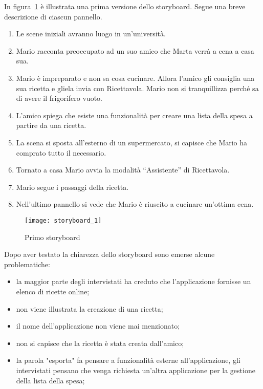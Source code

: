 In figura~\ref{fig:storyboard_1} è illustrata una prima versione dello storyboard.
Segue una breve descrizione di ciascun pannello.
\begin{enumerate}
  \item Le scene iniziali avranno luogo in un'università.
  \item Mario racconta preoccupato ad un suo amico che Marta verrà a cena a casa sua.
  \item Mario è impreparato e non sa cosa cucinare.
    Allora l'amico gli consiglia una sua ricetta e gliela invia con Ricettavola.
    Mario non si tranquillizza perché sa di avere il frigorifero vuoto.
  \item L'amico spiega che esiste una funzionalità per creare una lista della spesa a partire da una ricetta.
  \item La scena si sposta all'esterno di un supermercato, si capisce che Mario ha comprato tutto il necessario.
  \item Tornato a casa Mario avvia la modalità ``Assistente'' di Ricettavola.
  \item Mario segue i passaggi della ricetta.
  \item Nell'ultimo pannello si vede che Mario è riuscito a cucinare un'ottima cena.
\end{enumerate}

\clearpage
\begin{figure}[!ht]
  \begin{center}
    \texttt{[image: storyboard\_1]}
    \caption{Primo storyboard}
    \label{fig:storyboard_1}
  \end{center}
\end{figure}
\clearpage

Dopo aver testato la chiarezza dello storyboard sono emerse alcune problematiche:
\begin{itemize}
  \item la maggior parte degli intervistati ha creduto che l'applicazione fornisse un elenco di ricette online;

  \item non viene illustrata la creazione di una ricetta;

  \item il nome dell'applicazione non viene mai menzionato;

  \item non si capisce che la ricetta è stata creata dall'amico;

  \item la parola "esporta" fa pensare a funzionalità esterne all'applicazione, gli intervistati pensano che venga richiesta un'altra applicazione per la gestione della lista della spesa;
\end{itemize}

